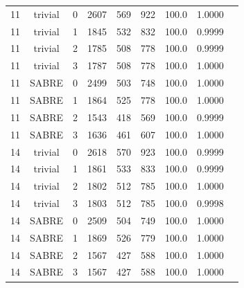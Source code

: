 \documentclass[12pt, spanish]{book}
\begin{document}
\begin{table}[H]
\begin{tabular}{cclcccccc}
        \hline
        11 & trivial & 0 & 2607 & 569  & 922  & 100.0 & 1.0000 \\
        11 & trivial & 1 & 1845 & 532  & 832  & 100.0 & 0.9999 \\
        11 & trivial & 2 & 1785 & 508  & 778  & 100.0 & 0.9999 \\
        11 & trivial & 3 & 1787 & 508  & 778  & 100.0 & 1.0000 \\
        11 & SABRE   & 0 & 2499 & 503  & 748  & 100.0 & 1.0000 \\
        11 & SABRE   & 1 & 1864 & 525  & 778  & 100.0 & 1.0000 \\
        11 & SABRE   & 2 & 1543 & 418  & 569  & 100.0 & 0.9999 \\
        11 & SABRE   & 3 & 1636 & 461  & 607  & 100.0 & 1.0000 \\
        \hline
        14 & trivial & 0 & 2618 & 570  & 923  & 100.0 & 0.9999 \\
        14 & trivial & 1 & 1861 & 533  & 833  & 100.0 & 0.9999 \\
        14 & trivial & 2 & 1802 & 512  & 785  & 100.0 & 1.0000 \\
        14 & trivial & 3 & 1803 & 512  & 785  & 100.0 & 0.9998 \\
        14 & SABRE   & 0 & 2509 & 504  & 749  & 100.0 & 1.0000 \\
        14 & SABRE   & 1 & 1869 & 526  & 779  & 100.0 & 1.0000 \\
        14 & SABRE   & 2 & 1567 & 427  & 588  & 100.0 & 1.0000 \\
        14 & SABRE   & 3 & 1567 & 427  & 588  & 100.0 & 1.0000 \\
        \hline
    \end{tabular}
\end{table}
\end{document}
